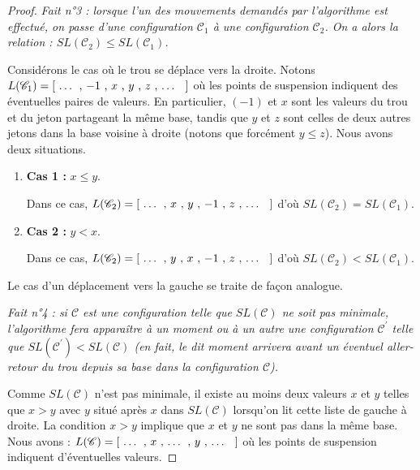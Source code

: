 \begin{proof}
    \medskip

    \textit{Fait n°3 : lorsque l'un des mouvements demandés par l'algorithme est effectué, on passe d'une configuration $\mathscr{C}_1$ à une configuration $\mathscr{C}_2$. On a alors la relation : $SL(\mathscr{C}_2) \leqslant SL(\mathscr{C}_1)$.}


    \medskip

    Considérons le cas où le trou se déplace vers la droite.
    Notons $L(\mathscr{C}_1) = [ \text{\ \dots{} , $-1$ , $x$ , $y$ , $z$ , \dots{} \ } ]$ où les points de suspension indiquent des éventuelles paires de valeurs.
    En particulier, $(-1)$ et $x$ sont les valeurs du trou et du jeton partageant la même base, tandis que $y$ et $z$ sont celles de deux autres jetons dans la base voisine à droite (notons que forcément $y \leqslant z$). Nous avons deux situations.

    \begin{enumerate}
        \item \textbf{Cas 1 :} $x \leqslant y$.

        Dans ce cas, $L(\mathscr{C}_2) = [ \text{\ \dots{} , $x$ , $y$ , $-1$ , $z$ , \dots{} \ } ]$ d'où $SL(\mathscr{C}_2) = SL(\mathscr{C}_1)$.

        \item \textbf{Cas 2 :} $y < x$.

        Dans ce cas, $L(\mathscr{C}_2) = [ \text{\ \dots{} , $y$ , $x$ , $-1$ , $z$ , \dots{} \ } ]$ d'où $SL(\mathscr{C}_2) < SL(\mathscr{C}_1)$.
        \end{enumerate}

    Le cas d'un déplacement vers la gauche se traite de façon analogue.


    \medskip

    \textit{Fait n°4 : si $\mathscr{C}$ est une configuration telle que $SL(\mathscr{C})$ ne soit pas minimale, l'algorithme fera apparaître à un moment ou à un autre une configuration $\mathscr{C}^\prime$ telle que $SL(\mathscr{C}^\prime) < SL(\mathscr{C})$ (en fait, le dit moment arrivera avant un éventuel aller-retour  du trou depuis sa base dans la configuration $\mathscr{C}$).}


    \medskip

    Comme $SL(\mathscr{C})$ n'est pas minimale, il existe au moins deux valeurs $x$ et $y$ telles que $x > y$ avec $y$ situé après $x$ dans $SL(\mathscr{C})$ lorsqu'on lit cette liste de gauche à droite.
    La condition $x > y$ implique que $x$ et $y$ ne sont pas dans la même base. Nous avons : $L(\mathscr{C}) = [ \text{\ \dots{} , $x$ , \dots{} , $y$ , \dots{} \ } ]$ où les points de suspension indiquent d'éventuelles valeurs.



\end{proof}
